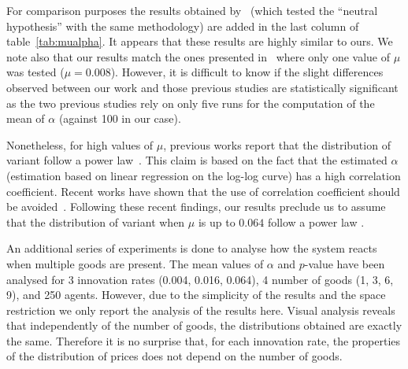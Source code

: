 \documentclass{wscpaperproc}
\newcommand{\memo}[2]{\textcolor{#1}{#2}}
\renewcommand{\memo}[2]{} %
\newcommand{\todo}[1]{\memo{red}{TODO: #1\\}}
\begin{document}
For comparison purposes the results obtained by~\cite{bentley_random_2004} (which tested the ``neutral hypothesis'' with the same methodology) are added in the last column of table~\ref{tab:mualpha}. It appears that these results are highly similar to ours. We note also that our results match the ones presented in~\cite{mesoudi_random_2009} where only one value of $\mu$ was tested ($\mu = 0.008$). However, it is difficult to know if the slight differences observed between our work and those previous studies are statistically significant as the two previous studies rely on only five runs for the computation of the mean of $\alpha$ (against 100 in our case).

Nonetheless, for high values of $\mu$, previous works report that the distribution of variant follow a power law~\cite{bentley_random_2004}. This claim is based on the fact that the estimated $\alpha$ (estimation based on linear regression on the log-log curve) has a high correlation coefficient. Recent works have shown that the use of correlation coefficient should be avoided~\cite{clauset2009powerlawdistributionsinempiricaldat}. Following these recent findings, our results preclude us to assume that the distribution of variant when $\mu$ is up to $0.064$ follow a power law . 

An additional series of experiments is done to analyse how the system reacts when multiple goods are present. The mean values of $\alpha$ and $p$-value have been analysed for 3 innovation rates (0.004, 0.016, 0.064), 4 number of goods (1, 3, 6, 9), and 250 agents. However, due to the simplicity of the results and the space restriction we only report the analysis of the results here. 
Visual analysis reveals that independently of the number of goods, the distributions obtained are exactly the same. Therefore it is no surprise that, for each innovation rate, the properties of the distribution of prices does not depend on the number of goods.
\end{document}
